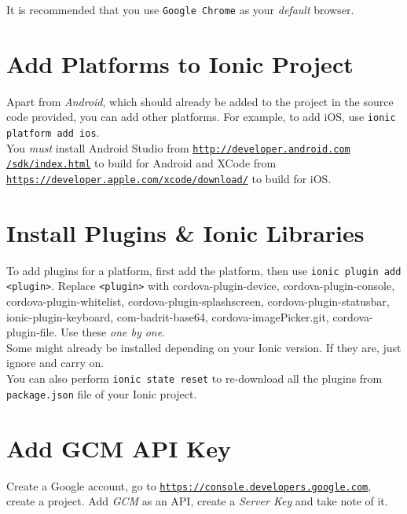 It is recommended that you use \texttt{Google Chrome} as your \textit{default} browser.

\section{Add Platforms to Ionic Project}

Apart from \textit{Android}, which should already be added to the project in the source code provided, you can add other platforms. For example, to add iOS, use \texttt{ionic platform add ios}.\\

You \textit{must} install Android Studio from \texttt{\hyperref[http://developer.android.com/sdk/index.html]{http://developer.android.com\\/sdk/index.html}} to build for Android and XCode from\\ \texttt{\hyperref[https://developer.apple.com/xcode/download/]{https://developer.apple.com/xcode/download/}} to build for iOS.

\section{Install Plugins \& Ionic Libraries}

To add plugins for a platform, first add the platform, then use \texttt{ionic plugin add <plugin>}. Replace \texttt{<plugin>} with cordova-plugin-device, cordova-plugin-console, cordova-plugin-whitelist, cordova-plugin-splashscreen, cordova-plugin-statusbar, ionic-plugin-keyboard, com-badrit-base64, cordova-imagePicker.git, cordova-plugin-file. Use these \textit{one by one}.\\

Some might already be installed depending on your Ionic version. If they are, just ignore and carry on.\\

You can also perform \texttt{ionic state reset} to re-download all the plugins from \texttt{package.json} file of your Ionic project.

\section{Add GCM API Key}

Create a Google account, go to \texttt{\hyperref[https://console.developers.google.com]{https://console.developers.google.com}}, create a project. Add \textit{GCM} as an API, create a \textit{Server Key} and take note of it.\\

